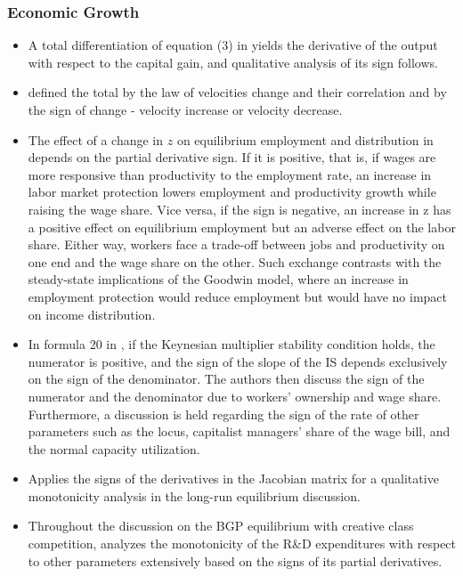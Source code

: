 \documentclass[11pt]{book}
\begin{document}
\subsubsection{Economic Growth}
\begin{itemize}
\item A total differentiation of equation (3) in \cite{bhaduri2015systemic}
yields the derivative of the output with respect to the capital gain,
and qualitative analysis of its sign follows.
\item \cite{sukharev2016structural}
defined the total by the law of velocities change and their correlation
and by the sign of change - velocity increase or velocity decrease.
\item The effect of a change in $z$ on equilibrium employment and distribution
in \cite{tavani2017endogenous}
depends on the partial derivative sign. If it is positive, that is,
if wages are more responsive than productivity to the employment rate,
an increase in labor market protection lowers employment and productivity
growth while raising the wage share. Vice versa, if the sign is negative,
an increase in z has a positive effect on equilibrium employment but
an adverse effect on the labor share. Either way, workers face a trade-off
between jobs and productivity on one end and the wage share on the
other. Such exchange contrasts with the steady-state implications
of the Goodwin model, where an increase in employment protection would
reduce employment but would have no impact on income distribution.
\item In formula 20 in \cite{palley2017inequality},
if the Keynesian multiplier stability condition holds, the numerator
is positive, and the sign of the slope of the IS depends exclusively
on the sign of the denominator. The authors then discuss the sign
of the numerator and the denominator due to workers' ownership and
wage share. Furthermore, a discussion is held regarding the sign of
the rate of other parameters such as the locus, capitalist managers'
share of the wage bill, and the normal capacity utilization.
\item \cite{carvalho2017debt}
Applies the signs of the derivatives in the Jacobian matrix for a
qualitative monotonicity analysis in the long-run equilibrium discussion.
\item Throughout the discussion on the BGP equilibrium with creative class
competition, \cite{batabyal2018schumpeterian}
analyzes the monotonicity of the R\&D expenditures with respect to
other parameters extensively based on the signs of its partial derivatives.

\end{itemize}
\end{document}
